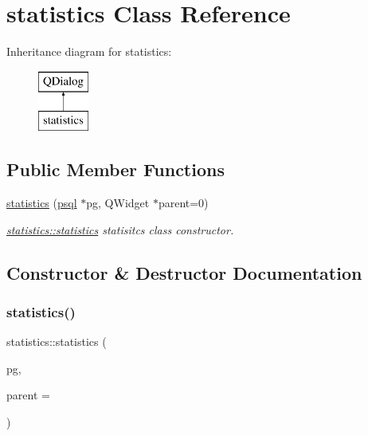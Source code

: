 \hypertarget{classstatistics}{}\section{statistics Class Reference}
\label{classstatistics}
Inheritance diagram for statistics\+:\begin{figure}[H]
\begin{center}
\leavevmode
\includegraphics[height=2.000000cm]{classstatistics}
\end{center}
\end{figure}
\subsection*{Public Member Functions}
\begin{DoxyCompactItemize}
\item 
\hyperlink{classstatistics_aaa102e49836a3b719df3a82e28735adc}{statistics} (\hyperlink{classpsql}{psql} $\ast$pg, Q\+Widget $\ast$parent=0)
\begin{DoxyCompactList}\small\item\em \hyperlink{classstatistics_aaa102e49836a3b719df3a82e28735adc}{statistics\+::statistics} statisitcs class constructor. \end{DoxyCompactList}\end{DoxyCompactItemize}


\subsection{Constructor \& Destructor Documentation}
\mbox{\label{classstatistics_aaa102e49836a3b719df3a82e28735adc}} 
\subsubsection{\texorpdfstring{statistics()}{statistics()}}
{\footnotesize\ttfamily statistics\+::statistics (\begin{DoxyParamCaption}\item[{\hyperlink{classpsql}{psql} $\ast$}]{pg,  }\item[{Q\+Widget $\ast$}]{parent = {} }\end{DoxyParamCaption})\hspace{0.3cm}{\ttfamily [explicit]}}



